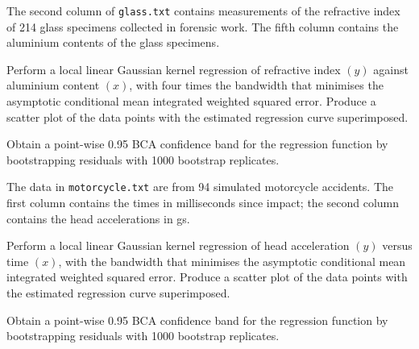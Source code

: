 \begin{exercise}
The second column of {\tt glass.txt} contains measurements of the refractive index of 214 glass specimens collected in forensic work. The fifth column contains the aluminium contents of the glass specimens.
\begin{asparaenum}[(a)]
\item Perform a local linear Gaussian kernel regression of refractive index $(y)$ against aluminium content $(x)$, with four times the bandwidth that minimises the asymptotic conditional mean integrated weighted squared error. Produce a scatter plot of the data points with the estimated regression curve superimposed.
\item Obtain a point-wise 0.95 BCA confidence band for the regression function by bootstrapping residuals with 1000 bootstrap replicates.
\end{asparaenum}
\end{exercise}

\begin{exercise}
The data in {\tt motorcycle.txt} are from 94 simulated motorcycle accidents. The first column contains the times in milliseconds since impact; the second column contains the head accelerations in gs.
\begin{asparaenum}[(a)]
\item Perform a local linear Gaussian kernel regression of head acceleration $(y)$ versus time $(x)$, with the bandwidth that minimises the asymptotic conditional mean integrated weighted squared error. Produce a scatter plot of the data points with the estimated regression curve superimposed.
\item Obtain a point-wise 0.95 BCA confidence band for the regression function by bootstrapping residuals with 1000 bootstrap replicates.
\end{asparaenum}
\end{exercise}
